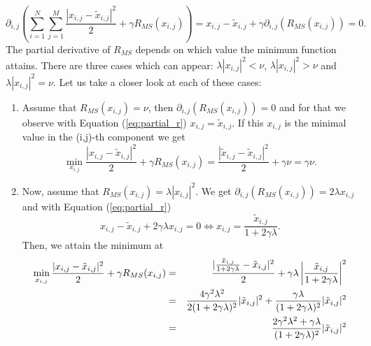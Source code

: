 \documentclass[abstracton]{scrreprt}
\begin{document}
                \begin{equation}
                    \partial_{i,j} \left( \sum_{i = 1}^{N} \sum_{j = 1}^{M} \frac{|x_{i,j} - \tilde{x}_{i,j}|^{2}}{2} + \gamma R_{MS}(x_{i,j}) \right) = x_{i,j} - \tilde{x}_{i,j} + \gamma \partial_{i,j} (R_{MS}(x_{i,j})) = 0.
                    \label{eq:partial_r}
                \end{equation}
            The partial derivative of $R_{MS}$ depends on which value the minimum function attains. There are three cases which can appear: $\lambda |x_{i,j}|^{2} < \nu$, $\lambda |x_{i,j}|^{2} > \nu$ and $\lambda |x_{i,j}|^{2} = \nu$. Let us take a closer look at each of these cases:
                \begin{enumerate}
                    \item Assume that $R_{MS}(x_{i,j}) = \nu$, then $\partial_{i,j} \left(R_{MS}(x_{i,j})\right) = 0$
                    and for that we observe with Equation (\ref{eq:partial_r}) $x_{i,j} = \tilde{x}_{i,j}$. If this $x_{i,j}$ is the minimal value in the (i,j)-th component we get
                        $$
                            \min_{x_{i,j}} \frac{|x_{i,j} - \tilde{x}_{i,j}|^{2}}{2} + \gamma R_{MS}(x_{i,j}) = \frac{|\tilde{x}_{i,j} - \tilde{x}_{i,j}|^{2}}{2} + \gamma \nu = \gamma \nu.
                        $$
                    \item Now, assume that $R_{MS}(x_{i,j}) = \lambda|x_{i,j}|^{2}$. We get $\partial_{i,j} \left(R_{MS}(x_{i,j})\right) = 2\lambda x_{i,j}$ and with Equation (\ref{eq:partial_r})
                        $$
                            x_{i,j} - \tilde{x}_{i,j} + 2 \gamma \lambda x_{i,j} = 0 \iff x_{i,j} = \frac{\tilde{x}_{i,j}}{1 + 2 \gamma \lambda}.
                        $$
                    Then, we attain the minimum at
                        \begin{eqnarray}
                            \min_{x_{i,j}} \frac{|x_{i,j} - \tilde{x}_{i,j}|^{2}}{2} + \gamma R_{MS}(x_{i,j}) &=& \frac{|\frac{\tilde{x}_{i,j}}{1 + 2 \gamma \lambda} - \tilde{x}_{i,j}|^{2}}{2} + \gamma \lambda \left|\frac{\tilde{x}_{i,j}}{1 + 2 \gamma \lambda}\right|^{2} \notag \\
                            &=& \frac{4\gamma^{2}\lambda^{2}}{2(1 + 2\gamma\lambda)^{2}} |\tilde{x}_{i,j}|^{2} + \frac{\gamma\lambda}{(1 + 2\gamma\lambda)^{2}} |\tilde{x}_{i,j}|^{2} \notag \\
                            &=& \frac{2\gamma^{2}\lambda^{2} + \gamma\lambda}{(1 + 2\gamma\lambda)^{2}} |\tilde{x}_{i,j}|^{2} \notag \\

\end{eqnarray}
\end{enumerate}
\end{document}

